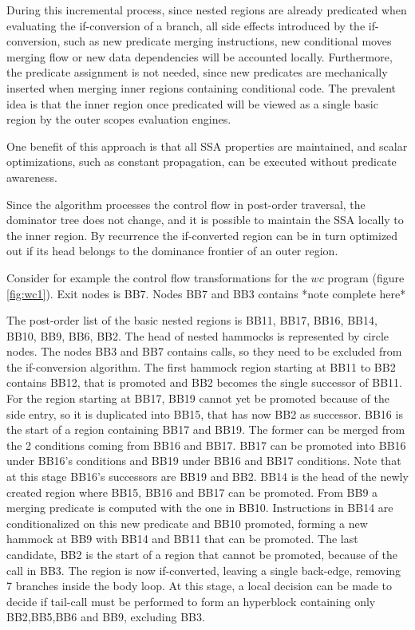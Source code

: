 During this incremental process, since nested regions are already predicated when evaluating the if-conversion of a branch, all side effects introduced by the if-conversion, such as new predicate merging instructions, new conditional moves merging flow or new data dependencies will be accounted locally. Furthermore, the predicate assignment is not needed, since new predicates are mechanically inserted when merging inner regions containing conditional code. The prevalent idea is that the inner region once predicated will be viewed as a single basic region by the outer scopes evaluation engines.

One benefit of this approach is that all SSA properties are maintained, and scalar optimizations, such as constant propagation, can be executed without predicate awareness. 

Since the algorithm processes the control flow in post-order traversal, the dominator tree does not change, and it is possible to maintain the SSA locally to the inner region. By recurrence the if-converted region can be in turn optimized out if its head belongs to the dominance frontier of an outer region.

Consider for example the control flow transformations for the $wc$ program (figure \ref{fig:wc1}). Exit nodes is BB7. Nodes BB7 and BB3 contains *note complete here*

 The post-order list of the basic nested regions is {BB11, BB17, BB16, BB14, BB10, BB9, BB6, BB2}. The head of nested hammocks is represented by circle nodes. The nodes BB3 and BB7 contains calls, so they need to be excluded from the if-conversion algorithm.
The first hammock region starting at BB11 to BB2 contains BB12, that is promoted and BB2 becomes the single successor of BB11. 
For the region starting at BB17, BB19 cannot yet be promoted because of the side entry, so it is duplicated into BB15, that has now BB2 as successor.
BB16 is the start of a region containing BB17 and BB19. The former can be merged from the 2 conditions coming from BB16 and BB17. BB17 can be promoted into BB16 under BB16's conditions and BB19 under BB16 and BB17 conditions. Note that at this stage BB16's successors are BB19 and BB2.
BB14 is the head of the newly created region where BB15, BB16 and BB17 can be promoted. From BB9 a merging predicate is computed with the one in BB10. Instructions in BB14 are conditionalized on this new predicate and BB10 promoted, forming a new hammock at BB9 with BB14 and BB11 that can be promoted. The last candidate, BB2 is the start of a region that cannot be promoted, because of the call in BB3.
The region is now if-converted, leaving a single back-edge, removing 7 branches inside the body loop. At this stage, a local decision can be made to decide if tail-call must be performed to form an hyperblock containing only BB2,BB5,BB6 and BB9, excluding BB3. 


